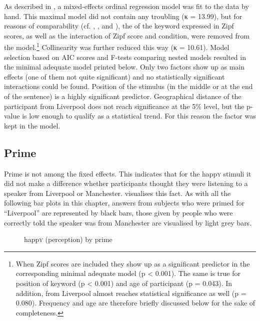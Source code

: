As described in , a mixed-effects ordinal regression model was fit to the data by hand.
This maximal model did not contain any troubling  (κ = 13.99), but for reasons of comparability (cf. , , and ), the  of the keyword expressed in Zipf scores, as well as the interaction of Zipf score and  condition, were removed from the model.\footnote{When Zipf scores are included they show up as a significant predictor in the corresponding minimal adequate model (p < 0.001). The same is true for position of keyword (p < 0.001) and age of participant (p = 0.043). In addition,  from Liverpool almost reaches statistical significance as well (p = 0.080). Frequency and age are therefore briefly discussed below for the sake of completeness.}
Collinearity was further reduced this way (κ = 10.61).
Model selection based on AIC scores and F-tests comparing nested models resulted in the minimal adequate model printed below.
Only two factors show up as main effects (one of them not quite significant) and no statistically significant interactions could be found.
Position of the stimulus (in the middle or at the end of the sentence) is a highly significant predictor.
Geographical distance of the participant from Liverpool does not reach significance at the 5\% level, but the p-value is low enough to qualify as a statistical trend.
For this reason the factor was kept in the model.


\subsection{Prime}
\label{sec.perc_res.happy.prime}

Prime is not among the fixed effects.
This indicates that for the happ\textsc{y} stimuli it did not make a difference whether participants thought they were listening to a speaker from Liverpool or Manchester.
 visualises this fact.
As with all the following bar plots in this chapter, answers from subjects who were primed for ``Liverpool'' are represented by black bars, those given by people who were correctly told the speaker was from Manchester are visualised by light grey bars.

\begin{figure}
	
		\resizebox{.49\linewidth}{!}{} 
	\caption{happ\textsc{y} (perception) by prime}
	\label{fig.bar.happy.tot.ext}
\end{figure}

